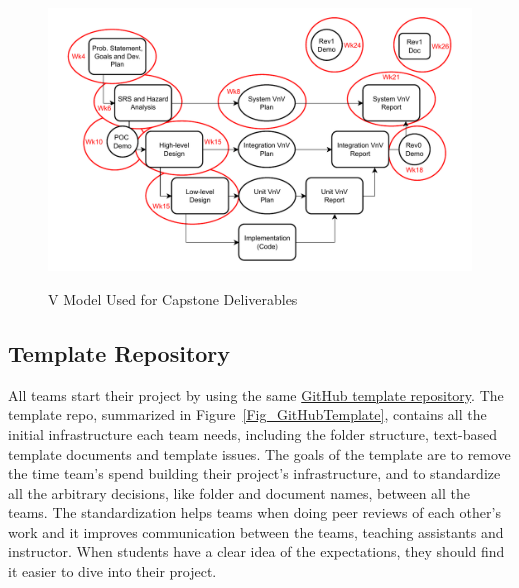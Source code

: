 \documentclass[10pt, conference]{IEEEtran}
\begin{document}
\begin{figure}[h!]
  \hspace{-0.6cm}
    {
      \includegraphics[width=1.1\columnwidth]{./figures/CourseStructure.drawio.pdf}
    }
    \caption{\label{Fig_VModel} V Model Used for Capstone Deliverables}
\end{figure}
\subsection{Template Repository}

All teams start their project by using the same
\href{REDACTED Link} {GitHub template repository}. The template repo, summarized
in Figure~\ref{Fig_GitHubTemplate}, contains all the initial infrastructure each
team needs, including the folder structure, text-based template documents and
template issues. The goals of the template are to remove the time team's spend
building their project's infrastructure, and to standardize all the arbitrary
decisions, like folder and document names, between all the teams. The
standardization helps teams when doing peer reviews of each other's work and it
improves communication between the teams, teaching assistants and instructor.
When students have a clear idea of the expectations, they should find it easier
to dive into their project.
\end{document}
